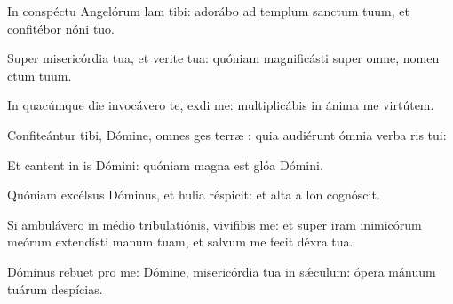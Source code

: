 \item {}

\item In conspéctu Angelórum lam tibi:\psstar{} adorábo ad templum sanctum tuum, et confitébor nóni tuo.

\item Super misericórdia tua, et verite tua:\psstar{} quóniam magnificásti super omne, nomen ctum tuum.

\item In quacúmque die invocávero te, exdi me:\psstar{} multiplicábis in ánima me virtútem.

\item Confiteántur tibi, Dómine, omnes ges terræ :\psstar{} quia audiérunt ómnia verba ris tui:

\item Et cantent in is Dómini:\psstar{} quóniam magna est glóa Dómini.

\item Quóniam excélsus Dóminus, et hulia réspicit:\psstar{} et alta a lon cognóscit.

\item Si ambulávero in médio tribulatiónis, vivifibis me:\psstar{} et super iram inimicórum meórum extendísti manum tuam, et salvum me fecit déxra tua.

\item Dóminus rebuet pro me:\psstar{} Dómine, misericórdia tua in sǽculum: ópera mánuum tuárum  despícias.
